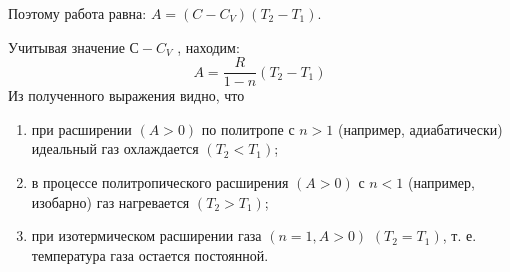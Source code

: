 Поэтому работа равна: $A = (C - C_{V})(T_{2} - T_{1})$.

Учитывая значение $С - C_{V}$ , находим:
\begin{equation}
  A = \frac{R}{1-n}(T_2 -T_1)
\end{equation}
Из полученного выражения видно, что
\begin{enumerate}
  \item при расширении $(A > 0)$ по политропе с $n > 1$ (например, адиабатически) идеальный газ охлаждается $(T_{2} < T_{1})$;
  \item в процессе политропического расширения $(A > 0)$ с $n < 1$ (например, изобарно) газ нагревается
  $(T_{2} > T_{1})$;
  \item при изотермическом расширении газа $(n = 1, A > 0)$  $(T_{2} = T_{1})$, т. е. температура газа остается постоянной.
\end{enumerate}














